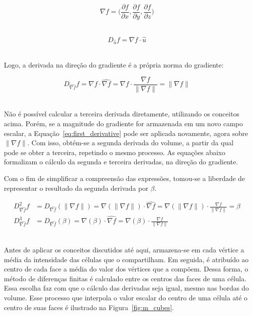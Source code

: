 \begin{equation}\label{eq:grad}
	\nabla f = \bigg(\frac{\partial f}{\partial x}, \frac{\partial f}{\partial y}, \frac{\partial f}{\partial z}\bigg)
\end{equation} \

\begin{equation}\label{eq:ddir}
D_{\widehat{u}} f = \nabla f \cdot \widehat{u}
\end{equation} \

	Logo, a derivada na direção do gradiente é a própria norma do gradiente:

\begin{equation}\label{eq:first_derivative}
	D_{\widehat{\nabla f}} f = \nabla f \cdot \widehat{\nabla f} = \nabla f \cdot \frac{\nabla f}{\|\nabla f\|} = \|\nabla f\|
\end{equation} \

	Não é possível calcular a terceira derivada diretamente, utilizando os conceitos acima. Porém, se a magnitude do gradiente for armazenada em um novo campo escalar, a Equação~\eqref{eq:first_derivative} pode ser aplicada novamente, agora sobre $ \|\nabla f\| $. Com isso, obtém-se a segunda derivada do volume, a partir da qual pode se obter a terceira, repetindo o mesmo processo. As equações abaixo formalizam o cálculo da segunda e terceira derivadas, na direção do gradiente. 
	
	Com o fim de simplificar a compreensão das expressões, tomou-se a liberdade de representar o resultado da segunda derivada por $ \beta $.
	
\begin{align}
	\label{eq:second_derivative}
	D^{2}_{\widehat{\nabla f}} f & = D_{\widehat{\nabla f}} (\|\nabla f\|) = \nabla (\|\nabla f\|) \cdot \widehat{\nabla f} = \nabla (\|\nabla f\|) \cdot \frac{\nabla f}{\|\nabla f\|} = \beta \\
	\label{eq:third_derivative}
	D^{3}_{\widehat{\nabla f}} f & = D_{\widehat{\nabla f}} (\beta) = \nabla (\beta) \cdot \widehat{\nabla f} = \nabla (\beta) \cdot \frac{\nabla f}{\|\nabla f\|}
\end{align} \

	Antes de aplicar os conceitos discutidos até aqui, armazena-se em cada vértice a média da intensidade das células que o compartilham. Em seguida, é atribuído ao centro de cada face a média do valor dos vértices que a compõem. Dessa forma, o método de diferenças finitas é calculado entre os centros das faces de uma célula. Essa escolha faz com que o cálculo das derivadas seja igual, mesmo nas bordas do volume. Esse processo que interpola o valor escalar do centro de uma célula até o centro de suas faces é ilustrado na Figura~\ref{fig:m_cubes}.
	
